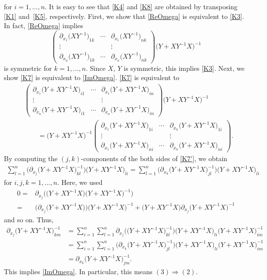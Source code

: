 \documentclass[10pt,a4paper]{amsart}
\numberwithin{equation}{section}
\begin{document}
for $i=1,\ldots ,n$. It is easy to see that \eqref{K4} and \eqref{K8} are obtained by transposing \eqref{K1} and~\eqref{K5}, respectively. First, we show that \eqref{ReOmega} is equivalent to \eqref{K3}. In fact, \eqref{ReOmega} implies
\[
\begin{pmatrix}
\partial_{x_1}\bigl(XY^{-1}\bigr)_{1k} & \cdots & \partial_{x_1}\bigl(XY^{-1}\bigr)_{nk} \\
\vdots & & \vdots \\
\partial_{x_n}\bigl(XY^{-1}\bigr)_{1k} & \cdots & \partial_{x_n}\bigl(XY^{-1}\bigr)_{nk}
\end{pmatrix}
\bigl(Y+XY^{-1}X\bigr)^{-1}
\]
is symmetric for $k=1,\ldots , n$. Since $X$, $Y$ is symmetric, this implies \eqref{K3}. Next, we show \eqref{K7} is equivalent to \eqref{ImOmega}. \eqref{K7} is equivalent to
\begin{align}
&\begin{pmatrix}
\partial_{x_1}\bigl(Y+XY^{-1}X\bigr)_{i1} & \cdots & \partial_{x_1}\bigl(Y+XY^{-1}X\bigr)_{in} \\
\vdots & & \vdots \\
\partial_{x_n}\bigl(Y+XY^{-1}X\bigr)_{i1} & \cdots & \partial_{x_n}\bigl(Y+XY^{-1}X\bigr)_{in}
\end{pmatrix}
\bigl(Y+XY^{-1}X\bigr)^{-1}\nonumber\\
&\qquad=\bigl(Y+XY^{-1}X\bigr)^{-1}
\begin{pmatrix}
\partial_{x_1}\bigl(Y+XY^{-1}X\bigr)_{1i} & \cdots & \partial_{x_n}\bigl(Y+XY^{-1}X\bigr)_{1i} \\
\vdots & & \vdots \\
\partial_{x_1}\bigl(Y+XY^{-1}X\bigr)_{ni} & \cdots & \partial_{x_n}\bigl(Y+XY^{-1}X\bigr)_{ni}
\end{pmatrix}.\label{K7'}
\end{align}
By computing the $(j, k)$-components of the both sides of \eqref{K7'}, we obtain
\begin{gather*}
\sum_{l=1}^n\bigl(\partial_{x_j}\bigl(Y+XY^{-1}X\bigr)^{-1}_{kl}\bigr)\bigl(Y+XY^{-1}X\bigr)_{li}=\sum_{l=1}^n\bigl(\partial_{x_k}\bigl(Y+XY^{-1}X\bigr)^{-1}_{jl}\bigr)\bigl(Y+XY^{-1}X\bigr)_{li}
\end{gather*}
for $i, j, k=1,\ldots , n$. Here, we used
\begin{align*}
0={}&\partial_{x_j}\bigl(\bigl(Y+XY^{-1}X\bigr)\bigl(Y+XY^{-1}X\bigr)^{-1}\bigr) \\
={}&\bigl(\partial_{x_j}\bigl(Y+XY^{-1}X\bigr)\bigr)\bigl(Y+XY^{-1}X\bigr)^{-1}+\bigl(Y+XY^{-1}X\bigr)\partial_{x_j}\bigl(Y+XY^{-1}X\bigr)^{-1}
\end{align*}
and so on. Thus,
\begin{align*}
\partial_{x_j}\bigl(Y+XY^{-1}X\bigr)^{-1}_{km}&=\sum_{i=1}^n\sum_{l=1}^n\partial_{x_j}\bigl(\bigl(Y+XY^{-1}X\bigr)^{-1}_{kl}\bigr)\bigl(Y+XY^{-1}X\bigr)_{li}\bigl(Y+XY^{-1}X\bigr)^{-1}_{im} \\
&=\sum_{i=1}^n\sum_{l=1}^n\bigl(\partial_{x_k}\bigl(Y+XY^{-1}X\bigr)^{-1}_{jl}\bigr)\bigl(Y+XY^{-1}X\bigr)_{li}\bigl(Y+XY^{-1}X\bigr)^{-1}_{im} \\
&=\partial_{x_k}\bigl(Y+XY^{-1}X\bigr)^{-1}_{jm}.
\end{align*}
This implies \eqref{ImOmega}. In particular, this means $(3)\Rightarrow (2)$.
\end{document}
